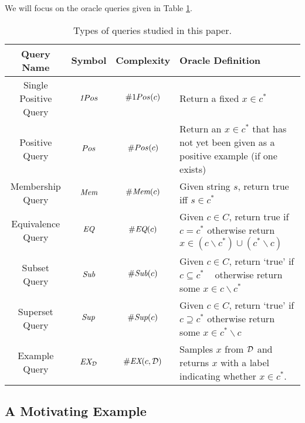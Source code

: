 We will focus on the oracle queries given in Table \ref{table:queries}.

\begin{table}
\begin{center}
  \begin{tabularx}{\textwidth}{| c | c | c | X | }
    \hline
    Query Name & Symbol & Complexity & Oracle Definition \\ \hline
    Single Positive Query & $\emph{1}Pos$ & $\oneposC(c)$ & Return a fixed $x \in c^*$ \\ \hline
    Positive Query & $Pos$ & $\#Pos(c)$ & Return an $x\in c^*$ that has not yet been given as a positive example (if one exists)\\ \hline
    Membership Query & $\emph{Mem}$ & $\#\emph{Mem}(c)$ & Given string $s$, return true iff $s \in c^*$ \\ \hline
    Equivalence Query & $\emph{EQ}$ & $\#\emph{EQ}(c)$ & Given $c \in C$, return true if $c=c^*$ otherwise return $x \in (c \backslash c^*) \cup (c^* \backslash c)$\\ \hline 
    Subset Query & $\emph{Sub}$ & $\#\emph{Sub}(c)$ & Given $c \in C$, return `true' if $c \subseteq c^*$ \mbox{  } otherwise return some $x \in c \backslash c^*$ \\ \hline
    Superset Query & $\emph{Sup}$ & $\#\emph{Sup}(c)$ & Given $c \in C$, return `true' if $c \supseteq c^*$  otherwise return some $x \in c^* \backslash c$\\ \hline
    Example Query & $\emph{EX}_{\mathcal{D}}$ & $\#\emph{EX}(c, \mathcal{D})$ & Samples $x$ from $\mathcal{D}$ and returns $x$ with a label indicating whether $x \in c^*$. \\ \hline
  \end{tabularx}
\end{center}
\caption{Types of queries studied in this paper.}
\label{table:queries}
\end{table}

\subsection{A Motivating Example}


